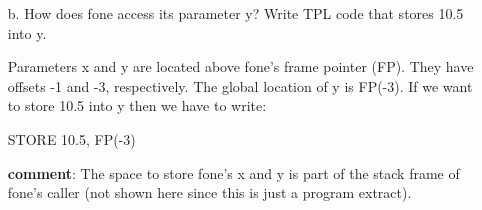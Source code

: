 \documentclass{article}
\newcommand{\comment}{\textbf{comment}}
\begin{document}
\begin{enumerate}
\begin{itemize}
Frame size = 12

\comment: A function's stack frame (assuming that it does not have to store any temporaries or values stored in registers) stores:
\begin{itemize}
\item  its local variables (fone's a,b,c,and d)
\item  If it makes any function calls (in our example, fone calls ftwo): 
\begin{itemize}
\item The return address. This is the address of the instruction where execution resumes after the call to ftwo terminates i.e. the address of the instruction inmediately after \verb+d := ftwo((float) c, y, 15.5)+. The virtual machine needs to know where to return! The size of this is always one (the size of an address).
\item The value returned by the called function (ftwo's returned value, a boolean). The size of this depends on the size of the return type of the called function.
\item The parameters passed to the called function (ftwo's parameters p1,p2 and p3)
\end{itemize}
\end{itemize}

\item[b.] How does fone access its parameter y? Write TPL code that stores 10.5 into y.

Parameters x and y are located above fone's frame pointer (FP). They have offsets -1 and -3, respectively. The global location of y is FP(-3). If we want to store 10.5 into y then we have to write:

STORE 10.5, FP(-3)

\comment: The space to store fone's x and y is part of the stack frame of fone's caller (not shown here since this is just a program extract).

\end{itemize}



\end{enumerate}
\end{document}
